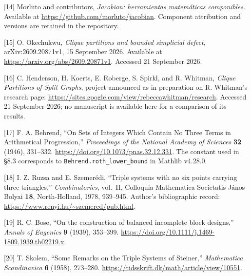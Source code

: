 \documentclass[english,11pt,a4paper]{article}
\begin{document}
{[}14{]} Morluto and contributors, \emph{Jacobian: herramientas matemáticas componibles}. Available at \url{https://github.com/morluto/jacobian}. Component attribution and versions are retained in the repository.

{[}15{]} O. Okechukwu, \emph{Clique partitions and bounded simplicial defect}, arXiv:2609.20871v1, 15 September 2026. Available at \url{https://arxiv.org/abs/2609.20871v1}. Accessed 21 September 2026.

{[}16{]} C. Henderson, H. Koerts, E. Roberge, S. Spirkl, and R. Whitman, \emph{Clique Partitions of Split Graphs}, project announced as in preparation on R. Whitman's research page: \url{https://sites.google.com/view/rebeccawhitman/research}. Accessed 21 September 2026; no manuscript is available here for a comparison of its results.

{[}17{]} F. A. Behrend, ``On Sets of Integers Which Contain No Three Terms in Arithmetical Progression,'' \emph{Proceedings of the National Academy of Sciences} \textbf{32} (1946), 331--332. \url{https://doi.org/10.1073/pnas.32.12.331}. The constant used in §8.3 corresponds to \nolinkurl{Behrend.roth_lower_bound} in Mathlib v4.28.0.

{[}18{]} I. Z. Ruzsa and E. Szemerédi, ``Triple systems with no six points carrying three triangles,'' \emph{Combinatorics}, vol.~II, Colloquia Mathematica Societatis János Bolyai \textbf{18}, North-Holland, 1978, 939--945. Author's bibliographic record: \url{https://www.renyi.hu/~szemered/pub.html}.

{[}19{]} R. C. Bose, ``On the construction of balanced incomplete block designs,'' \emph{Annals of Eugenics} \textbf{9} (1939), 353--399. \url{https://doi.org/10.1111/j.1469-1809.1939.tb02219.x}.

{[}20{]} T. Skolem, ``Some Remarks on the Triple Systems of Steiner,'' \emph{Mathematica Scandinavica} \textbf{6} (1958), 273--280. \url{https://tidsskrift.dk/math/article/view/10551}.

\endgroup
\end{document}
